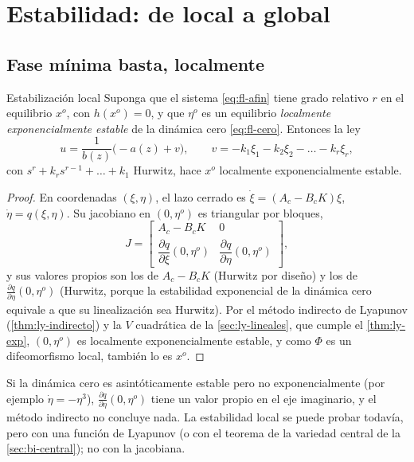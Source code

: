 \section{Estabilidad: de local a global}
\label{sec:fl-estabilidad}

\subsection{Fase mínima basta, localmente}

\begin{teorema}[label=thm:fl-local]{Estabilización local \citep{ByIs88}}
Suponga que el sistema \eqref{eq:fl-afin} tiene grado relativo $r$ en el equilibrio $x^o$, con $h(x^o)=0$, y que $\eta^o$ es un equilibrio \emph{localmente exponencialmente estable} de la dinámica cero \eqref{eq:fl-cero}. Entonces la ley
\[
  u=\frac{1}{b(z)}\bigl(-a(z)+v\bigr),\qquad v=-k_1\xi_1-k_2\xi_2-\dots-k_r\xi_r,
\]
con $s^r+k_rs^{r-1}+\dots+k_1$ Hurwitz, hace $x^o$ localmente exponencialmente estable.
\end{teorema}

\begin{proof}
En coordenadas $(\xi,\eta)$, el lazo cerrado es $\dot\xi=(A_c-B_cK)\xi$, $\dot\eta=q(\xi,\eta)$. Su jacobiano en $(0,\eta^o)$ es triangular por bloques,
\[
  J=\begin{bmatrix}A_c-B_cK&0\\[2pt] \dfrac{\partial q}{\partial\xi}(0,\eta^o)&\dfrac{\partial q}{\partial\eta}(0,\eta^o)\end{bmatrix},
\]
y sus valores propios son los de $A_c-B_cK$ (Hurwitz por diseño) y los de $\frac{\partial q}{\partial\eta}(0,\eta^o)$ (Hurwitz, porque la estabilidad exponencial de la dinámica cero equivale a que su linealización sea Hurwitz). Por el método indirecto de Lyapunov (\cref{thm:ly-indirecto}) y la $V$ cuadrática de la \cref{sec:ly-lineales}, que cumple el \cref{thm:ly-exp}, $(0,\eta^o)$ es localmente exponencialmente estable, y como $\Phi$ es un difeomorfismo local, también lo es $x^o$.
\end{proof}

\begin{cuidado}
Si la dinámica cero es asintóticamente estable pero no exponencialmente (por ejemplo $\dot\eta=-\eta^3$), $\frac{\partial q}{\partial\eta}(0,\eta^o)$ tiene un valor propio en el eje imaginario, y el método indirecto no concluye nada. La estabilidad local se puede probar todavía, pero con una función de Lyapunov (o con el teorema de la variedad central de la \cref{sec:bi-central}); no con la jacobiana.
\end{cuidado}

